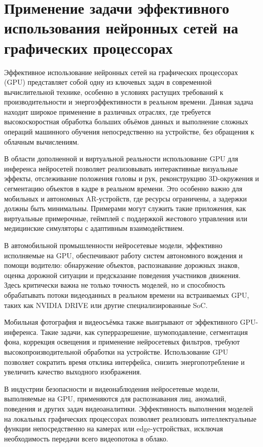 \documentclass[a4paper,14pt]{extreport}
\begin{document}
        \section{Применение задачи эффективного использования нейронных сетей на
графических процессорах}
        Эффективное использование нейронных сетей на графических процессорах (GPU) представляет собой одну из ключевых задач в современной вычислительной технике, особенно в условиях растущих требований к производительности и энергоэффективности в реальном времени. Данная задача находит широкое применение в различных отраслях, где требуется высокоскоростная обработка больших объёмов данных и выполнение сложных операций машинного обучения непосредственно на устройстве, без обращения к облачным вычислениям.

        В области дополненной и виртуальной реальности использование GPU для инференса нейросетей позволяет реализовывать интерактивные визуальные эффекты, отслеживание положения головы и рук, реконструкцию 3D-окружения и сегментацию объектов в кадре в реальном времени. Это особенно важно для мобильных и автономных AR-устройств, где ресурсы ограничены, а задержки должны быть минимальны. Примерами могут служить такие приложения, как виртуальные примерочные, геймплей с поддержкой жестового управления или медицинские симуляторы с адаптивным взаимодействием.
        
        В автомобильной промышленности нейросетевые модели, эффективно исполняемые на GPU, обеспечивают работу систем автономного вождения и помощи водителю: обнаружение объектов, распознавание дорожных знаков, оценка дорожной ситуации и предсказание поведения участников движения. Здесь критически важна не только точность моделей, но и способность обрабатывать потоки видеоданных в реальном времени на встраиваемых GPU, таких как NVIDIA DRIVE или другие специализированные SoC.
        
        Мобильная фотография и видеосъёмка также выигрывают от эффективного GPU-инференса. Такие задачи, как суперразрешение, шумоподавление, сегментация фона, коррекция освещения и применение нейросетевых фильтров, требуют высокопроизводительной обработки на устройстве. Использование GPU позволяет сократить время отклика интерфейса, снизить энергопотребление и увеличить качество выходного изображения.
        
        В индустрии безопасности и видеонаблюдения нейросетевые модели, выполняемые на GPU, применяются для распознавания лиц, аномалий, поведения и других задач видеоаналитики. Эффективность выполнения моделей на локальных графических процессорах позволяет реализовать интеллектуальные функции непосредственно на камерах или edge-устройствах, исключая необходимость передачи всего видеопотока в облако.
        
\end{document}
